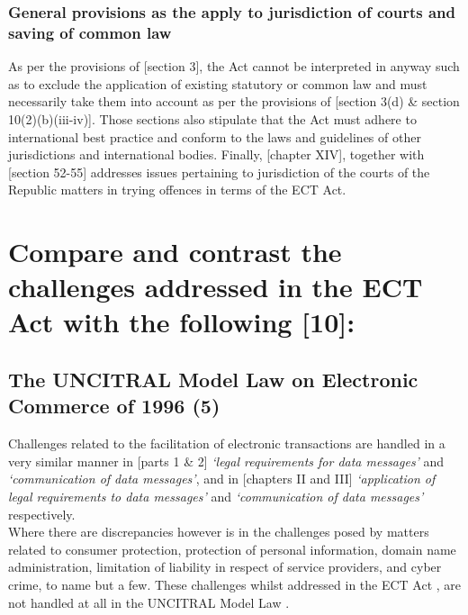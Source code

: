 \documentclass[11pt]{article}
\begin{document}
\subsubsection{General provisions as the apply to jurisdiction of courts and saving of common law}
\label{sec:org9509a25}
As per the provisions of [section 3]\cite{rsa02_elect_comm_trans_act}, the Act
cannot be interpreted in anyway such as to exclude the application of existing
statutory or common law and must necessarily take them into account as per the
provisions of [section 3(d) \& section
10(2)(b)(iii-iv)]\cite{rsa12_elect_comm_trans_amend_bill}. Those sections also
stipulate that the Act must adhere to international best practice and conform to
the laws and guidelines of other jurisdictions and international bodies.
Finally, [chapter XIV]\cite{rsa02_elect_comm_trans_act}, together with [section
52-55]\cite{rsa12_elect_comm_trans_amend_bill} addresses issues pertaining to
jurisdiction of the courts of the Republic matters in trying offences in terms
of the ECT Act.

\section{Compare and contrast the challenges addressed in the ECT Act with the following [10]:}
\label{sec:orga75fa69}

\subsection{The UNCITRAL Model Law on Electronic Commerce of 1996 (5)}
\label{sec:orgbc6a4d5}

Challenges related to the facilitation of electronic transactions are handled in a very
similar manner in [parts 1 \& 2]\cite{rsa02_elect_comm_trans_act} \emph{`legal
requirements for data messages'} and \emph{`communication of data messages'}, and in
[chapters II and III]\cite{un96_uncitral_model_law_ecomm} \emph{`application of legal
requirements to data messages'} and \emph{`communication of data messages'}
respectively.\\

Where there are discrepancies however is in the challenges posed by matters
related to consumer protection, protection of personal information, domain name
administration, limitation of liability in respect of service providers, and
cyber crime, to name but a few. These challenges whilst addressed in the ECT Act
\cite{rsa02_elect_comm_trans_act}, are not handled at all in the UNCITRAL Model Law
\cite{un96_uncitral_model_law_ecomm}.\\
\end{document}
